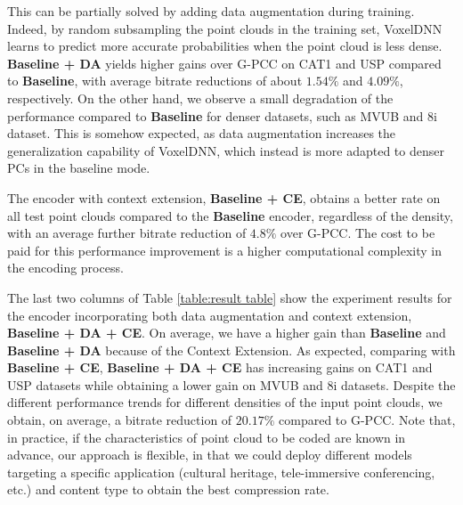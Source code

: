 This can be partially solved by adding data augmentation during training.
Indeed, by random subsampling the point clouds in the training set, VoxelDNN learns to predict more accurate probabilities when the point cloud is less dense. \textbf{Baseline + DA} yields higher gains over G-PCC on CAT1 and USP compared to \textbf{Baseline}, with average bitrate reductions of about $1.54\%$ and $4.09\%$, respectively. On the other hand, we observe a small degradation of the performance compared to \textbf{Baseline} for denser datasets, such as MVUB and 8i dataset. This is somehow expected, as data augmentation increases the generalization capability of VoxelDNN, which instead is more adapted to denser PCs in the baseline mode.
\par The encoder with context extension, \textbf{Baseline + CE}, obtains a better rate on all test point clouds compared to the  \textbf{Baseline} encoder, regardless of the density, with an average further bitrate reduction of $4.8\%$ over G-PCC. The cost to be paid for this performance improvement is a higher computational complexity in the encoding process.


\par The last two columns of Table \ref{table:result table} show the experiment results for the encoder incorporating both data augmentation and context extension, \textbf{Baseline + DA + CE}. On average, we have a higher gain than \textbf{Baseline} and \textbf{Baseline + DA} because of the Context Extension. As expected, comparing with \textbf{Baseline + CE}, \textbf{Baseline + DA + CE} has increasing gains on CAT1 and USP datasets while obtaining a lower gain on MVUB and 8i datasets. Despite the different performance trends for different densities of the input point clouds, we obtain, on average, a bitrate reduction of $20.17\%$ compared to G-PCC. Note that, in practice, if the characteristics of point cloud to be coded are known in advance, our approach is flexible, in that we could deploy different models targeting a specific application (cultural heritage, tele-immersive conferencing, etc.) and content type to obtain the best compression rate.

